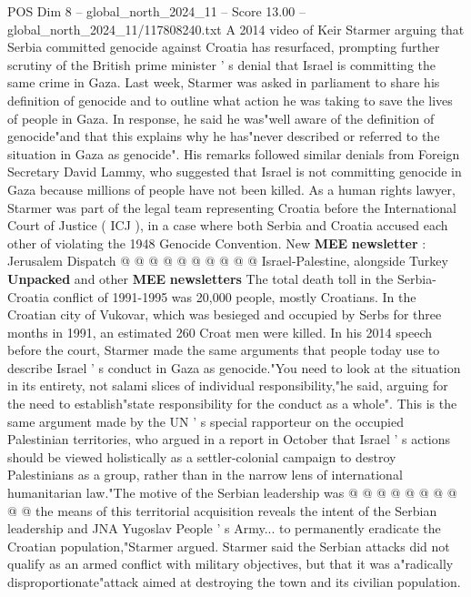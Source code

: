 \begin{textsample}{POS Dim 8 – global\_north\_2024\_11 – Score 13.00 – global\_north\_2024\_11/117808240.txt}  \label{ex:f8_pos_055}
A 2014 video of Keir Starmer arguing that Serbia committed genocide against Croatia has resurfaced, prompting further scrutiny of the British prime minister ' s denial that Israel is committing the same crime in Gaza.
Last week, Starmer was asked in parliament to share his definition of genocide and to outline what action he was taking to save the lives of people in Gaza.
In response, he said he was"well aware of the definition of genocide"and that this explains why he has"never described or referred to the situation in Gaza as genocide".
His remarks followed similar denials from Foreign Secretary David Lammy, who suggested that Israel is not committing genocide in Gaza because millions of people have not been killed.
As a human rights lawyer, Starmer was part of the legal team representing Croatia before the International Court of Justice ( ICJ ), in a case where both Serbia and Croatia accused each other of violating the 1948 Genocide Convention.
New \textbf{MEE} \textbf{newsletter} : Jerusalem Dispatch @ @ @ @ @ @ @ @ @ @ Israel-Palestine, alongside Turkey \textbf{Unpacked} and other \textbf{MEE} \textbf{newsletters} The total death toll in the Serbia-Croatia conflict of 1991-1995 was 20,000 people, mostly Croatians.
In the Croatian city of Vukovar, which was besieged and occupied by Serbs for three months in 1991, an estimated 260 Croat men were killed.
In his 2014 speech before the court, Starmer made the same arguments that people today use to describe Israel ' s conduct in Gaza as genocide."You need to look at the situation in its entirety, not salami slices of individual responsibility,"he said, arguing for the need to establish"state responsibility for the conduct as a whole".
This is the same argument made by the UN ' s special rapporteur on the occupied Palestinian territories, who argued in a report in October that Israel ' s actions should be viewed holistically as a settler-colonial campaign to destroy Palestinians as a group, rather than in the narrow lens of international humanitarian law."The motive of the Serbian leadership was @ @ @ @ @ @ @ @ @ @ the means of this territorial acquisition reveals the intent of the Serbian leadership and JNA Yugoslav People ' s Army... to permanently eradicate the Croatian population,"Starmer argued.
Starmer said the Serbian attacks did not qualify as an armed conflict with military objectives, but that it was a"radically disproportionate"attack aimed at destroying the town and its civilian population.

\end{textsample}
